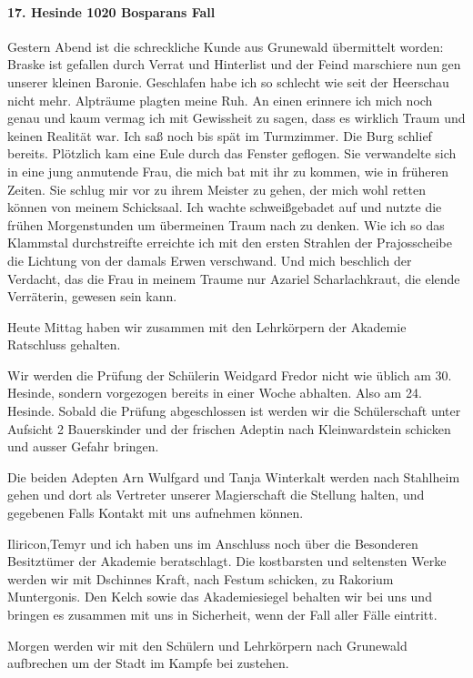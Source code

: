 \paragraph{17. Hesinde 1020 Bosparans Fall}
Gestern Abend ist die schreckliche Kunde aus Grunewald übermittelt worden: Braske ist gefallen durch Verrat und Hinterlist und der Feind marschiere nun gen unserer kleinen Baronie. Geschlafen habe ich so schlecht wie seit der Heerschau nicht mehr. Alpträume plagten meine Ruh. An einen erinnere ich mich noch genau und kaum vermag ich mit Gewissheit zu sagen, dass es wirklich Traum und keinen Realität war. Ich saß noch bis spät im Turmzimmer. Die Burg schlief bereits. Plötzlich kam eine Eule durch das Fenster geflogen. Sie verwandelte sich in eine jung anmutende Frau, die mich bat mit ihr zu kommen, wie in früheren Zeiten. Sie schlug mir vor zu ihrem Meister zu gehen, der mich wohl retten können von meinem Schicksaal. Ich wachte schweißgebadet auf und nutzte die frühen Morgenstunden um übermeinen Traum nach zu denken. Wie ich so das Klammstal durchstreifte erreichte ich mit den ersten Strahlen der Prajosscheibe die Lichtung von der damals Erwen verschwand. Und mich beschlich der Verdacht, das die Frau in meinem Traume nur Azariel Scharlachkraut, die elende Verräterin, gewesen sein kann.

Heute Mittag haben wir zusammen mit den Lehrkörpern der Akademie Ratschluss gehalten.

Wir werden die Prüfung der Schülerin Weidgard Fredor nicht wie üblich am 30. Hesinde, sondern vorgezogen bereits in einer Woche abhalten. Also am 24. Hesinde. Sobald die Prüfung abgeschlossen ist werden wir die Schülerschaft unter Aufsicht 2 Bauerskinder und der frischen Adeptin nach Kleinwardstein schicken und ausser Gefahr bringen.

Die beiden Adepten Arn Wulfgard und Tanja Winterkalt werden nach Stahlheim gehen und dort als Vertreter unserer Magierschaft die Stellung halten, und gegebenen Falls Kontakt mit uns aufnehmen können.

Iliricon,Temyr und ich haben uns im Anschluss noch über die Besonderen Besitztümer der Akademie beratschlagt. Die kostbarsten und seltensten Werke werden wir mit Dschinnes Kraft, nach Festum schicken, zu Rakorium Muntergonis. Den Kelch sowie das Akademiesiegel behalten wir bei uns und bringen es zusammen mit uns in Sicherheit, wenn der Fall aller Fälle eintritt.

Morgen werden wir mit den Schülern und Lehrkörpern nach Grunewald aufbrechen um der Stadt im Kampfe bei zustehen.

